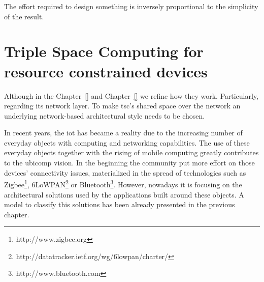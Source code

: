 

\begin{savequote}[50mm]
The effort required to design something is inversely proportional to the simplicity of the result.%
\end{savequote}


\newcommand{\codigo}[1]{``\texttt{#1}''}
\newcommand{\primquery}{\emph{query}}
\newcommand{\primread}{\emph{read}}
\newcommand{\primtake}{\emph{take}}
\newcommand{\primwrite}{\emph{write}}


\chapter{Triple Space Computing for resource constrained devices}
\label{cha:tsc}
\newcommand{\pathchapthree}{3_tsc}

\ifpdf
    \graphicspath{{\pathchapthree/figures/PNG/}{\pathchapthree/figures/PDF/}{\pathchapthree/figures/}}
\else
    \graphicspath{{\pathchapthree/figures/EPS/}{\pathchapthree/figures/}}
\fi







Although in the Chapter~\ref{} and Chapter~\ref{} we refine how they work.
Particularly, 
regarding its network layer.
To make \ac{tsc}'s shared space over the network an underlying network-based architectural style needs to be chosen.


In recent years, the \acf{iot} has became a reality due to the increasing number of everyday objects with computing and networking capabilities.
The use of these everyday objects together with the rising of mobile computing greatly contributes to the \ac{ubicomp} vision.
In the beginning the community put more effort on those devices' connectivity issues, materialized in the spread of technologies such as Zigbee\footnote{http://www.zigbee.org}, 6LoWPAN\footnote{http://datatracker.ietf.org/wg/6lowpan/charter/} or Bluetooth\footnote{http://www.bluetooth.com}.
However, nowadays it is focusing on the architectural solutions used by the applications built around these objects.
A model to classify this solutions has been already presented in the previous chapter. %


